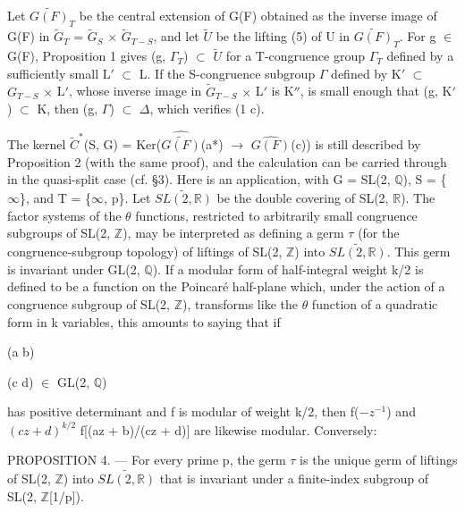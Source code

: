 \documentclass[10pt,a4paper]{article}
\begin{document}
\smallskip
\noindent Let \ensuremath{\widetilde{G(F)}_T} be the central extension of G(F) obtained as the inverse image of G(F) in \ensuremath{\widetilde{G}_T} = \ensuremath{\widetilde{G}_S} \ensuremath{×} \ensuremath{\widetilde{G}_{T−S}}, and let \ensuremath{\widetilde{U}} be the lifting (5) of U in \ensuremath{\widetilde{G(F)}_T}. For g \ensuremath{∈} G(F), Proposition 1 gives (g, \ensuremath{Γ_T}) \ensuremath{⊂} \ensuremath{\widetilde{U}} for a T-congruence group \ensuremath{Γ_T} defined by a sufficiently small L\ensuremath{′} \ensuremath{⊂} L. If the S-congruence subgroup \ensuremath{Γ} defined by K\ensuremath{′} \ensuremath{⊂} \ensuremath{G_{T−S}} \ensuremath{×} L\ensuremath{′}, whose inverse image in \ensuremath{\widetilde{G}_{T−S}} \ensuremath{×} L\ensuremath{′} is K\ensuremath{″}, is small enough that (g, K\ensuremath{′}) \ensuremath{⊂} K, then (g, \ensuremath{Γ}) \ensuremath{⊂} \ensuremath{Δ}, which verifies (1 c).\par
\smallskip
\noindent The kernel \ensuremath{\widetilde{C}^{*}}(S, G) = Ker(\ensuremath{\widehat{\widetilde{G(F)}}}(a*) \ensuremath{→} \ensuremath{\widehat{G(F)}}(c)) is still described by Proposition 2 (with the same proof), and the calculation can be carried through in the quasi-split case (cf. §3). Here is an application, with G = SL(2, \ensuremath{ℚ}), S = \{\ensuremath{∞}\}, and T = \{\ensuremath{∞}, p\}. Let \ensuremath{\widetilde{SL(2, ℝ)}} be the double covering of SL(2, \ensuremath{ℝ}). The factor systems of the \ensuremath{θ} functions, restricted to arbitrarily small congruence subgroups of SL(2, \ensuremath{ℤ}), may be interpreted as defining a germ \ensuremath{τ} (for the congruence-subgroup topology) of liftings of SL(2, \ensuremath{ℤ}) into \ensuremath{\widetilde{SL(2, ℝ)}}. This germ is invariant under GL(2, \ensuremath{ℚ}). If a modular form of half-integral weight k/2 is defined to be a function on the Poincaré half-plane which, under the action of a congruence subgroup of SL(2, \ensuremath{ℤ}), transforms like the \ensuremath{θ} function of a quadratic form in k variables, this amounts to saying that if\par
\smallskip
\noindent (a  b)\par
\noindent (c  d) \ensuremath{∈} GL(2, \ensuremath{ℚ})\par
\smallskip
\noindent has positive determinant and f is modular of weight k/2, then f(\ensuremath{−}\ensuremath{z^{-1}}) and \ensuremath{(cz + d)^{k/2}} f[(az + b)/(cz + d)] are likewise modular. Conversely:\par
\smallskip
\noindent PROPOSITION 4. — For every prime p, the germ \ensuremath{τ} is the unique germ of liftings of SL(2, \ensuremath{ℤ}) into \ensuremath{\widetilde{SL(2, ℝ)}} that is invariant under a finite-index subgroup of SL(2, \ensuremath{ℤ}[1/p]).\par
\end{document}
